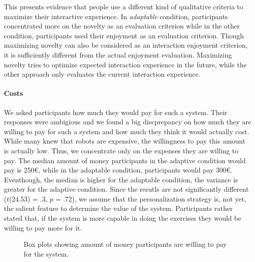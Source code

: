 \documentclass[twocolumn]{svjour3}          %
\begin{document}
This presents evidence that people use a different kind of qualitative criteria to maximize their interactive experience. In \textit{adaptable} condition, participants concentrated more on the novelty as an evaluation criterion while in the other condition, participants used their enjoyment as an evaluation criterion. Though maximizing novelty can also be considered as an interaction enjoyment criterion, it is sufficiently different from the actual enjoyment evaluation. Maximizing novelty tries to optimize expected interaction experience in the future, while the other approach only evaluates the current interaction experience.

\paragraph{Costs}
We asked participants how much they would pay for such a system. Their responses were ambigious and we found a big discprepancy on how much they are willing to pay for such a system and how much they think it would actually cost. While many knew that robots are expensive, the willingness to pay this amount is actually low. Thus, we concentrate only on the expenses they are willing to pay. The median amount of money participants in the adaptive condition would pay is 250\euro, while in the adaptable condition, participants would pay 300\euro. Eventhough, the median is higher for the adaptable condition, the variance is greater for the adaptive condition. Since the resutls are not significantly different ($t$(24.53) = .3, $p$ = .72), we assume that the personalization strategy is, not yet, the salient feature to determine the value of the system. Participants rather stated that, if the system is more capable in doing the exercises they would be willing to pay more for it.

\begin{figure}
 \caption{\label{fig:adapt:cost} Box plots showing amount of money participants are willing to pay for the system.}
\end{figure}
\end{document}
